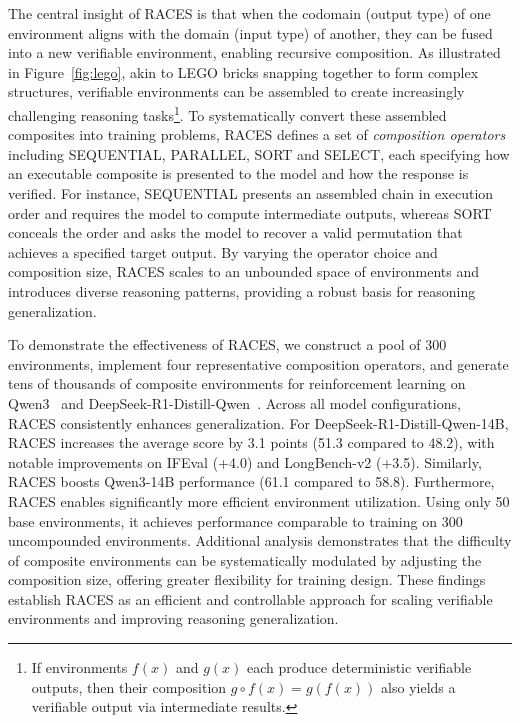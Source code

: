 The central insight of RACES is that when the codomain (output type) of one environment aligns with the domain (input type) of another, they can be fused into a new verifiable environment, enabling recursive composition.
As illustrated in Figure~\ref{fig:lego}, akin to LEGO bricks snapping together to form complex structures, verifiable environments can be assembled to create increasingly challenging reasoning tasks\footnote{If environments $f(x)$ and $g(x)$ each produce deterministic verifiable outputs, then their composition $g\circ f(x)=g(f(x))$ also yields a verifiable output via intermediate results.}.
To systematically convert these assembled composites into training problems, RACES defines a set of \emph{composition operators} including \textsc{SEQUENTIAL}, \textsc{PARALLEL}, \textsc{SORT} and \textsc{SELECT}, each specifying how an executable composite is presented to the model and how the response is verified.
For instance, \textsc{SEQUENTIAL} presents an assembled chain in execution order and requires the model to compute intermediate outputs, whereas \textsc{SORT} conceals the order and asks the model to recover a valid permutation that achieves a specified target output. By varying the operator choice and composition size, RACES scales to an unbounded space of environments and introduces diverse reasoning patterns, providing a robust basis for reasoning generalization.

To demonstrate the effectiveness of RACES, we construct a pool of 300 environments, implement four representative composition operators, and generate tens of thousands of composite environments for reinforcement learning on Qwen3~\citep{qwen3technicalreport} and DeepSeek-R1-Distill-Qwen~\citep{deepseekai2025deepseekr1incentivizingreasoningcapability}.
Across all model configurations, RACES consistently enhances generalization. For DeepSeek-R1-Distill-Qwen-14B, RACES increases the average score by 3.1 points (51.3 compared to 48.2), with notable improvements on IFEval (+4.0) and LongBench-v2 (+3.5). Similarly, RACES boosts Qwen3-14B performance (61.1 compared to 58.8).
Furthermore, RACES enables significantly more efficient environment utilization. Using only 50 base environments, it achieves performance comparable to training on 300 uncompounded environments.
Additional analysis demonstrates that the difficulty of composite environments can be systematically modulated by adjusting the composition size, offering greater flexibility for training design.
These findings establish RACES as an efficient and controllable approach for scaling verifiable environments and improving reasoning generalization.
